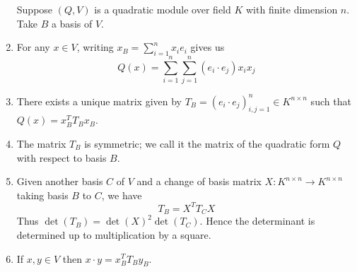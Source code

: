 \begin{prop}
    \begin{enumerate}
        Suppose $(Q,V)$ is a quadratic module over field $K$
        with finite dimension $n$. 
        Take $B$ a basis of $V$.
        \item For any $x \in V$, 
        writing $x_B = \sum_{i = 1}^n x_i e_i$
        gives us 
        \[Q(x) = 
        \sum_{i = 1}^n \sum_{j = 1}^n (e_i \cdot e_j) x_i x_j\]
        \item There exists a unique matrix
        given by
        $T_B = (e_i \cdot e_j)_{i,j = 1}^n \in K^{n\times n}$ 
        such that $Q(x) = x_B^T T_B x_B$.
        \item The matrix $T_B$ is symmetric;
        we call it the matrix of the quadratic form $Q$
        with respect to basis $B$.

        \item Given another basis $C$ of $V$ and a change of basis matrix
        $X : K^{n \times n} \to K^{n \times n}$ 
        taking basis $B$ to $C$, we have
        \[T_B = X^T T_C X\]
        Thus $\det (T_B) = \det (X)^2 \det (T_C)$.
        Hence the determinant is determined up 
        to multiplication by a square.
        \item If $x, y \in V$ then $x \cdot y = x_B^T T_B y_B$.
\end{enumerate}
\end{prop}

